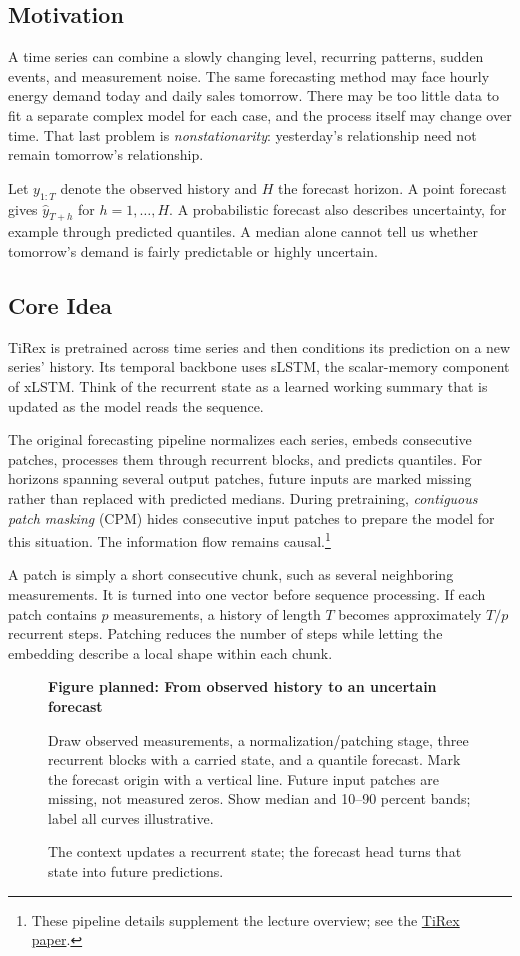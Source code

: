 \documentclass[11pt, oneside]{book}
\let\originalsubsection\subsection
\renewcommand{\subsection}{\Needspace{6\baselineskip}\originalsubsection}
\newcommand{\figureplaceholder}[5]{%
\begin{figure}[htbp]
\centering
\begin{tcolorbox}[unbreakable,width=\linewidth,height=#1,colback=accent!3,
  colframe=accent!30,boxrule=0.5pt,arc=2.5mm,sharp corners=all,
  valign=center,halign=center,fontupper=\small]
{\bfseries\color{accent}Figure planned: #2}\par\medskip
{\color{gray!75!black}#3}
\end{tcolorbox}
\caption{#4}\label{#5}
\end{figure}}
\begin{document}
\subsection{Motivation}\label{sec:source-9-1-1}
A time series can combine a slowly changing level, recurring patterns, sudden events, and measurement noise. The same forecasting method may face hourly energy demand today and daily sales tomorrow. There may be too little data to fit a separate complex model for each case, and the process itself may change over time. That last problem is \emph{nonstationarity}: yesterday's relationship need not remain tomorrow's relationship.

Let $y_{1:T}$ denote the observed history and $H$ the forecast horizon. A point forecast gives $\widehat y_{T+h}$ for $h=1,\ldots,H$. A probabilistic forecast also describes uncertainty, for example through predicted quantiles. A median alone cannot tell us whether tomorrow's demand is fairly predictable or highly uncertain.

\subsection{Core Idea}\label{sec:source-9-1-2}
TiRex is pretrained across time series and then conditions its prediction on a new series' history. Its temporal backbone uses sLSTM, the scalar-memory component of xLSTM. Think of the recurrent state as a learned working summary that is updated as the model reads the sequence.

The original forecasting pipeline normalizes each series, embeds consecutive patches, processes them through recurrent blocks, and predicts quantiles. For horizons spanning several output patches, future inputs are marked missing rather than replaced with predicted medians. During pretraining, \emph{contiguous patch masking} (CPM) hides consecutive input patches to prepare the model for this situation. The information flow remains causal.\footnote{These pipeline details supplement the lecture overview; see the \href{https://arxiv.org/abs/2505.23719}{TiRex paper}.}

A patch is simply a short consecutive chunk, such as several neighboring measurements. It is turned into one vector before sequence processing. If each patch contains $p$ measurements, a history of length $T$ becomes approximately $T/p$ recurrent steps. Patching reduces the number of steps while letting the embedding describe a local shape within each chunk.

\figureplaceholder{4.0cm}{From observed history to an uncertain forecast}{Draw observed measurements, a normalization/patching stage, three recurrent blocks with a carried state, and a quantile forecast. Mark the forecast origin with a vertical line. Future input patches are missing, not measured zeros. Show median and 10--90 percent bands; label all curves illustrative.}{The context updates a recurrent state; the forecast head turns that state into future predictions.}{fig:tirex-pipeline}
\end{document}
